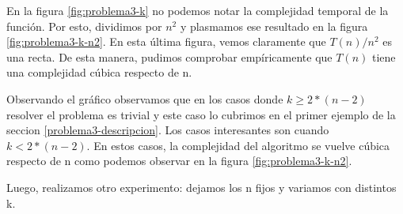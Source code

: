 En la figura \ref{fig:problema3-k} no podemos notar la complejidad temporal de la función. Por esto, dividimos por $n^2$ y plasmamos ese resultado en la figura \ref{fig:problema3-k-n2}. En esta última figura, vemos claramente que $T(n) / n ^ 2$ es una recta. De esta manera, pudimos comprobar empíricamente que $T(n)$ tiene una complejidad cúbica respecto de n.

Observando el gráfico observamos que en los casos donde $k \geq 2*(n-2)$ resolver el problema es trivial y este caso lo cubrimos en el primer ejemplo de la seccion \ref{problema3-descripcion}. Los casos interesantes son cuando $k < 2*(n-2)$. En estos casos, la complejidad del algoritmo se vuelve cúbica respecto de n como podemos observar en la figura \ref{fig:problema3-k-n2}.

Luego, realizamos otro experimento: dejamos los n fijos y variamos con distintos k.

